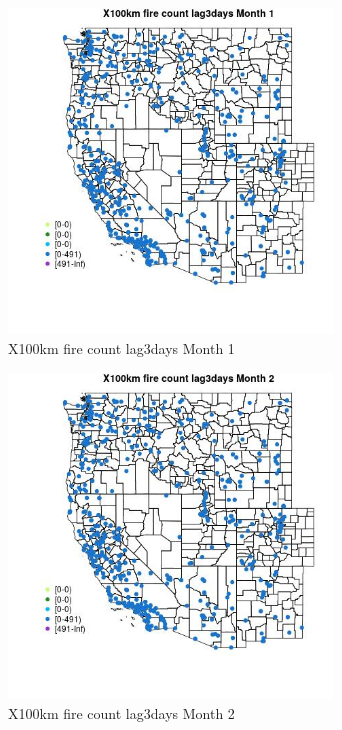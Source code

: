 \begin{figure} 
\centering  
\includegraphics[width=0.77\textwidth]{Code_Outputs/Report_ML_input_PM25_Step4_part_e_de_duplicated_aves_compiled_2019-05-14wNAs_MapObsMo1X100km_fire_count_lag3days.jpg} 
\caption{\label{fig:Report_ML_input_PM25_Step4_part_e_de_duplicated_aves_compiled_2019-05-14wNAsMapObsMo1X100km_fire_count_lag3days}X100km fire count lag3days Month 1} 
\end{figure} 
 

\begin{figure} 
\centering  
\includegraphics[width=0.77\textwidth]{Code_Outputs/Report_ML_input_PM25_Step4_part_e_de_duplicated_aves_compiled_2019-05-14wNAs_MapObsMo2X100km_fire_count_lag3days.jpg} 
\caption{\label{fig:Report_ML_input_PM25_Step4_part_e_de_duplicated_aves_compiled_2019-05-14wNAsMapObsMo2X100km_fire_count_lag3days}X100km fire count lag3days Month 2} 
\end{figure} 
 

